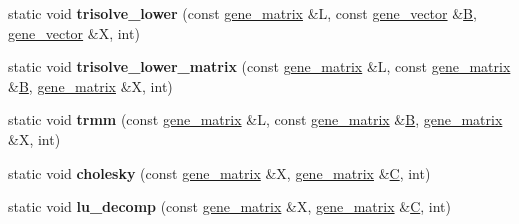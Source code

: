 \begin{DoxyCompactItemize}
\item 
\mbox{\label{classeigen3__interface_a80c1abf491f0c583a810e09cf2700ae3}} 
static void {\bfseries trisolve\+\_\+lower} (const \hyperlink{group___core___module_class_eigen_1_1_matrix}{gene\+\_\+matrix} \&L, const \hyperlink{group___core___module_class_eigen_1_1_matrix}{gene\+\_\+vector} \&\hyperlink{group___core___module_class_eigen_1_1_matrix}{B}, \hyperlink{group___core___module_class_eigen_1_1_matrix}{gene\+\_\+vector} \&X, int)
\item 
\mbox{\label{classeigen3__interface_a9269dd9282029b9c78ff2dc4c200e179}} 
static void {\bfseries trisolve\+\_\+lower\+\_\+matrix} (const \hyperlink{group___core___module_class_eigen_1_1_matrix}{gene\+\_\+matrix} \&L, const \hyperlink{group___core___module_class_eigen_1_1_matrix}{gene\+\_\+matrix} \&\hyperlink{group___core___module_class_eigen_1_1_matrix}{B}, \hyperlink{group___core___module_class_eigen_1_1_matrix}{gene\+\_\+matrix} \&X, int)
\item 
\mbox{\label{classeigen3__interface_adc120fbc410c139277c955f0da3e4c1b}} 
static void {\bfseries trmm} (const \hyperlink{group___core___module_class_eigen_1_1_matrix}{gene\+\_\+matrix} \&L, const \hyperlink{group___core___module_class_eigen_1_1_matrix}{gene\+\_\+matrix} \&\hyperlink{group___core___module_class_eigen_1_1_matrix}{B}, \hyperlink{group___core___module_class_eigen_1_1_matrix}{gene\+\_\+matrix} \&X, int)
\item 
\mbox{\label{classeigen3__interface_a6102457cfad48d50f019c7c95bc0b43d}} 
static void {\bfseries cholesky} (const \hyperlink{group___core___module_class_eigen_1_1_matrix}{gene\+\_\+matrix} \&X, \hyperlink{group___core___module_class_eigen_1_1_matrix}{gene\+\_\+matrix} \&\hyperlink{group___core___module}{C}, int)
\item 
\mbox{\label{classeigen3__interface_a606d44542d7882e4e8f895098eaf6f23}} 
static void {\bfseries lu\+\_\+decomp} (const \hyperlink{group___core___module_class_eigen_1_1_matrix}{gene\+\_\+matrix} \&X, \hyperlink{group___core___module_class_eigen_1_1_matrix}{gene\+\_\+matrix} \&\hyperlink{group___core___module}{C}, int)
\item 
\mbox{\label{classeigen3__interface_add6ceaf00965b00fc42a8e8d19c2245f}} 

\end{DoxyCompactItemize}
